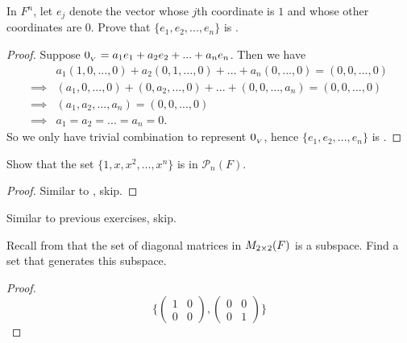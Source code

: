 \begin{exercise} \label{exercise 1.5.4}
In \(F^n\), let \(e_j\) denote the vector whose \(j\)th coordinate is \(1\) and whose other coordinates are \(0\).
Prove that \( \{ e_1, e_2, ..., e_n \} \) is \LID{}.
\end{exercise}

\begin{proof}
Suppose \(0_{_V} = a_1 e_1 + a_2 e_2 + ... + a_n e_n\).
Then we have
\begin{align*}
             & a_1 (1, 0, ..., 0) + a_2 (0, 1, ..., 0) + ... + a_n(0, ..., 0) = (0, 0, ..., 0) \\
    \implies & (a_1, 0, ..., 0) + (0, a_2, ..., 0) + ... + (0, 0, ..., a_n) = (0, 0, ..., 0) \\
    \implies & (a_1, a_2, ..., a_n) = (0, 0, ..., 0) \\
    \implies & a_1 = a_2 = ... = a_n = 0.
\end{align*}
So we only have trivial combination to represent \(0_{_V}\), hence \( \{ e_1, e_2, ..., e_n \} \) is \LID{}.
\end{proof}

\begin{exercise} \label{exercise 1.5.5}
Show that the set \(\{ 1, x, x^2, ..., x^n \}\) is \LID{} in \(\mathcal{P}_n(F)\).
\end{exercise}

\begin{proof}
Similar to , skip.
\end{proof}

\begin{exercise} \label{exercise 1.5.6}
Similar to previous exercises, skip.
\end{exercise}

\begin{exercise} \label{exercise 1.5.7}
Recall from  that the set of diagonal matrices in \(M_{2 \times 2}(F)\) is a subspace.
Find a \LID{} set that generates this subspace.
\end{exercise}

\begin{proof}
\[
\bigg\{
    \begin{pmatrix}
        1 & 0 \\
        0 & 0
    \end{pmatrix},
    \begin{pmatrix}
        0 & 0 \\
        0 & 1
    \end{pmatrix}
\bigg\}
\]
\end{proof}

